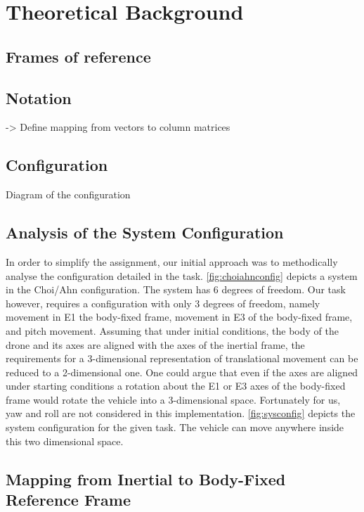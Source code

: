 \section{Theoretical Background}



\subsection{Frames of reference}

\subsection{Notation} %
-> Define mapping from vectors to column matrices
\subsection{Configuration}
Diagram of the configuration

\subsection{Analysis of the System Configuration}\label{s:analysis}
\label{fig:sysconfig}
\label{fig:choiahnconfig}
In order to simplify the assignment, our initial approach was to methodically analyse the configuration detailed in the task.
\cref{fig:choiahnconfig} depicts a system in the Choi/Ahn configuration. The system has 6 degrees of freedom. Our task however, requires a configuration with only 3 degrees of freedom, namely movement in E1 the body-fixed frame, movement in E3 of the body-fixed frame, and pitch movement.
Assuming that under initial conditions, the body of the drone and its axes are aligned with the axes of the inertial frame, the requirements for a 3-dimensional representation of translational movement can be reduced to a 2-dimensional one. One could argue that even if the axes are aligned under starting conditions a rotation about the E1 or E3 axes of the body-fixed frame would rotate the vehicle into a 3-dimensional space. Fortunately for us, yaw and roll are not considered in this implementation.
\cref{fig:sysconfig} depicts the system configuration for the given task. The vehicle can move anywhere inside this two dimensional space.

\subsection{Mapping from Inertial to Body-Fixed Reference Frame}\label{s:mapping}
